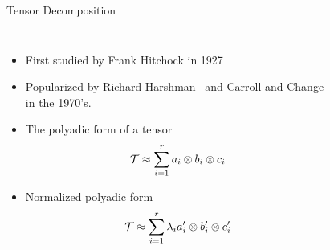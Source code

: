 \documentclass[handout]{beamer}
\begin{document}
\begin{frame}{Tensor Decomposition}
\begin{columns}

  \begin{itemize}[<+->]
      \small
\item First studied by Frank Hitchock in 1927~\cite{hitchcock1927}
\item Popularized by Richard Harshman~\cite{harshman1970} and Carroll
  and Change~\cite{carroll1970} in the 1970's.
\item The polyadic form of a tensor
  \[
      \mathcal{T} \approx \displaystyle\sum_{i=1}^{r} a_i \otimes b_i
  \otimes c_i
\]
\item Normalized polyadic form
  \[
      \mathcal{T} \approx \displaystyle\sum_{i=1}^{r} \lambda_i a'_i
  \otimes b'_i \otimes c'_i
  \]
\end{itemize}
\begin{figure}
  \centering
\end{figure}
\end{columns}
\end{frame}
\end{document}
